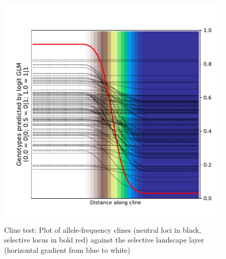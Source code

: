 ﻿\documentclass{article}
\begin{document}
\begin{figure}[!p]
        \includegraphics[width=175mm]{./img/final/CLINE_fitted_clines.pdf}
        \caption{Cline test: Plot of allele-frequency clines
                 (neutral loci in black, selective locus in bold red)
                 against the selective landscape layer
                 (horizontal gradient from blue to white)}
        \label{fig:cline_fits}
\end{figure}
\end{document}
